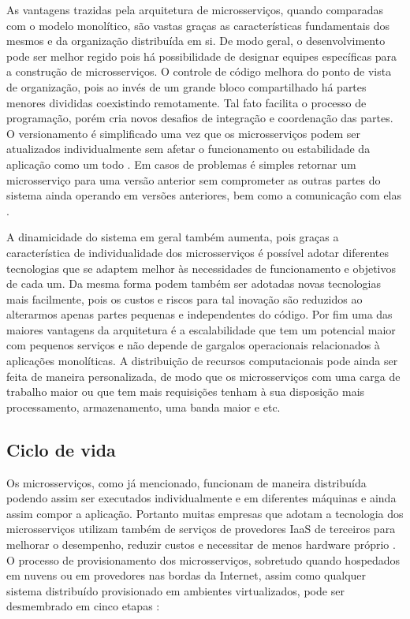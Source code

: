 As vantagens trazidas pela arquitetura de microsserviços, quando comparadas com o modelo monolítico, são vastas graças as características fundamentais dos mesmos e da organização distribuída em si.
%
De modo geral, o desenvolvimento pode ser melhor regido pois há possibilidade de designar equipes específicas para a construção  de microsserviços.
%
O controle de código melhora do ponto de vista de organização, pois ao invés de um grande bloco compartilhado há partes menores divididas coexistindo remotamente. Tal fato facilita o processo de programação, porém cria novos desafios de integração e coordenação das partes. 
%
O versionamento é simplificado uma vez que os microsserviços podem ser atualizados individualmente sem afetar o funcionamento ou estabilidade da aplicação como um todo \cite{microsservicos:artigo_microsservicos}. Em casos de problemas é simples retornar um microsserviço para uma versão anterior sem comprometer as outras partes do sistema ainda operando em versões anteriores, bem como a comunicação com elas \cite{microsservicos:newman_microsservicos}.

%
A dinamicidade do sistema em geral também aumenta, pois graças a característica de individualidade dos microsserviços é possível adotar diferentes tecnologias que se adaptem melhor às necessidades de funcionamento e objetivos de cada um.
%
Da mesma forma podem também ser adotadas novas tecnologias mais facilmente, pois os custos e riscos para tal inovação são reduzidos ao alterarmos apenas partes pequenas e independentes do código. 
%
Por fim uma das maiores vantagens da arquitetura é a escalabilidade que tem um potencial maior com pequenos serviços e não depende de  gargalos operacionais relacionados à aplicações monolíticas. A distribuição de recursos computacionais pode ainda ser feita de maneira personalizada, de modo que os microsserviços com uma carga de trabalho maior ou que tem mais requisições tenham à sua disposição mais processamento, armazenamento, uma banda maior e etc.


\subsection{Ciclo de vida}

Os microsserviços, como já mencionado, funcionam de maneira distribuída podendo assim ser executados individualmente e em diferentes máquinas e ainda assim compor a aplicação. Portanto muitas empresas que adotam a tecnologia dos microsserviços utilizam também de serviços de provedores \ac{IaaS} de terceiros para melhorar o desempenho, reduzir custos e necessitar de menos hardware próprio \cite{microsservicos:empresas}. O processo de provisionamento dos microsserviços, sobretudo quando hospedados em nuvens ou em provedores nas bordas da Internet, assim como qualquer sistema distribuído provisionado em ambientes virtualizados, pode ser desmembrado em cinco etapas \cite{nuvem_sla:tese_guilherme}: 

